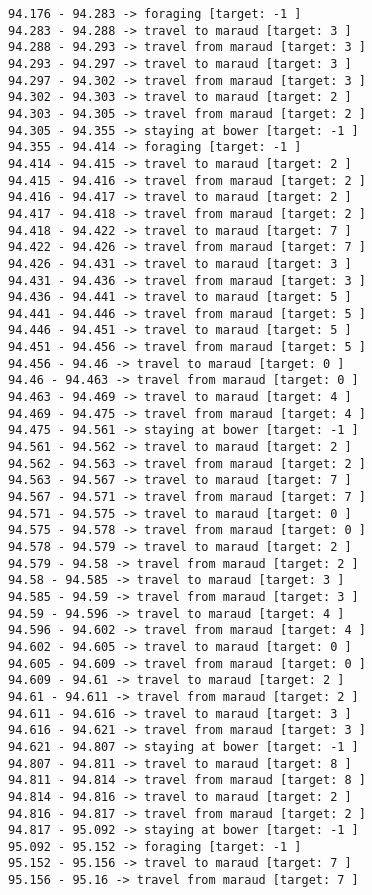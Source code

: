 \documentclass[11pt]{article}
\begin{document}
\begin{Verbatim}[commandchars=\\\{\}]
94.176 - 94.283 -> foraging [target: -1 ]
94.283 - 94.288 -> travel to maraud [target: 3 ]
94.288 - 94.293 -> travel from maraud [target: 3 ]
94.293 - 94.297 -> travel to maraud [target: 3 ]
94.297 - 94.302 -> travel from maraud [target: 3 ]
94.302 - 94.303 -> travel to maraud [target: 2 ]
94.303 - 94.305 -> travel from maraud [target: 2 ]
94.305 - 94.355 -> staying at bower [target: -1 ]
94.355 - 94.414 -> foraging [target: -1 ]
94.414 - 94.415 -> travel to maraud [target: 2 ]
94.415 - 94.416 -> travel from maraud [target: 2 ]
94.416 - 94.417 -> travel to maraud [target: 2 ]
94.417 - 94.418 -> travel from maraud [target: 2 ]
94.418 - 94.422 -> travel to maraud [target: 7 ]
94.422 - 94.426 -> travel from maraud [target: 7 ]
94.426 - 94.431 -> travel to maraud [target: 3 ]
94.431 - 94.436 -> travel from maraud [target: 3 ]
94.436 - 94.441 -> travel to maraud [target: 5 ]
94.441 - 94.446 -> travel from maraud [target: 5 ]
94.446 - 94.451 -> travel to maraud [target: 5 ]
94.451 - 94.456 -> travel from maraud [target: 5 ]
94.456 - 94.46 -> travel to maraud [target: 0 ]
94.46 - 94.463 -> travel from maraud [target: 0 ]
94.463 - 94.469 -> travel to maraud [target: 4 ]
94.469 - 94.475 -> travel from maraud [target: 4 ]
94.475 - 94.561 -> staying at bower [target: -1 ]
94.561 - 94.562 -> travel to maraud [target: 2 ]
94.562 - 94.563 -> travel from maraud [target: 2 ]
94.563 - 94.567 -> travel to maraud [target: 7 ]
94.567 - 94.571 -> travel from maraud [target: 7 ]
94.571 - 94.575 -> travel to maraud [target: 0 ]
94.575 - 94.578 -> travel from maraud [target: 0 ]
94.578 - 94.579 -> travel to maraud [target: 2 ]
94.579 - 94.58 -> travel from maraud [target: 2 ]
94.58 - 94.585 -> travel to maraud [target: 3 ]
94.585 - 94.59 -> travel from maraud [target: 3 ]
94.59 - 94.596 -> travel to maraud [target: 4 ]
94.596 - 94.602 -> travel from maraud [target: 4 ]
94.602 - 94.605 -> travel to maraud [target: 0 ]
94.605 - 94.609 -> travel from maraud [target: 0 ]
94.609 - 94.61 -> travel to maraud [target: 2 ]
94.61 - 94.611 -> travel from maraud [target: 2 ]
94.611 - 94.616 -> travel to maraud [target: 3 ]
94.616 - 94.621 -> travel from maraud [target: 3 ]
94.621 - 94.807 -> staying at bower [target: -1 ]
94.807 - 94.811 -> travel to maraud [target: 8 ]
94.811 - 94.814 -> travel from maraud [target: 8 ]
94.814 - 94.816 -> travel to maraud [target: 2 ]
94.816 - 94.817 -> travel from maraud [target: 2 ]
94.817 - 95.092 -> staying at bower [target: -1 ]
95.092 - 95.152 -> foraging [target: -1 ]
95.152 - 95.156 -> travel to maraud [target: 7 ]
95.156 - 95.16 -> travel from maraud [target: 7 ]

\end{Verbatim}
\end{document}
